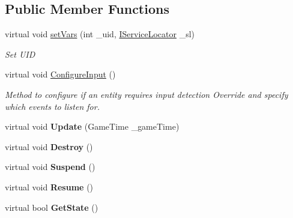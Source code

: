 \subsection*{Public Member Functions}
\begin{DoxyCompactItemize}
\item 
virtual void \mbox{\hyperlink{class_g_m_t_b_1_1_entities_1_1_entity_ae6d69c22b16436ec6df3b79099e1e81b}{set\+Vars}} (int \+\_\+uid, \mbox{\hyperlink{interface_g_m_t_b_1_1_interfaces_1_1_i_service_locator}{I\+Service\+Locator}} \+\_\+sl)
\begin{DoxyCompactList}\small\item\em Set U\+ID \end{DoxyCompactList}\item 
virtual void \mbox{\hyperlink{class_g_m_t_b_1_1_entities_1_1_entity_a73f4529a619029861fe443f95d13455c}{Configure\+Input}} ()
\begin{DoxyCompactList}\small\item\em Method to configure if an entity requires input detection Override and specify which events to listen for. \end{DoxyCompactList}\item 
\mbox{\label{class_g_m_t_b_1_1_entities_1_1_entity_ae60f8e246681666b514ac7f56f61c1ce}} 
virtual void {\bfseries Update} (Game\+Time \+\_\+game\+Time)
\item 
\mbox{\label{class_g_m_t_b_1_1_entities_1_1_entity_a48152c5bdd638aae00c961b1ed6da91e}} 
virtual void {\bfseries Destroy} ()
\item 
\mbox{\label{class_g_m_t_b_1_1_entities_1_1_entity_a516b3499690b30f9b4469b387713ad92}} 
virtual void {\bfseries Suspend} ()
\item 
\mbox{\label{class_g_m_t_b_1_1_entities_1_1_entity_a1f210094037d5c461432abb0c0e07ab1}} 
virtual void {\bfseries Resume} ()
\item 
\mbox{\label{class_g_m_t_b_1_1_entities_1_1_entity_a1267b231b54f569a6f7e03d62e41ef7d}} 
virtual bool {\bfseries Get\+State} ()
\end{DoxyCompactItemize}
